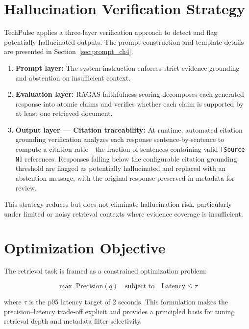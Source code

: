 \section{Hallucination Verification Strategy}
\label{sec:prompt}

TechPulse applies a three-layer verification approach to detect and flag potentially hallucinated outputs. The prompt construction and template details are presented in Section~\ref{sec:prompt_ch4}.

\begin{enumerate}[leftmargin=0.5in]
  \item \textbf{Prompt layer:} The system instruction enforces strict evidence grounding and abstention on insufficient context.

  \item \textbf{Evaluation layer:} RAGAS faithfulness scoring decomposes each generated response into atomic claims and verifies whether each claim is supported by at least one retrieved document.

  \item \textbf{Output layer --- Citation traceability:} At runtime, automated citation grounding verification analyzes each response sentence-by-sentence to compute a citation ratio---the fraction of sentences containing valid \texttt{[Source N]} references. Responses falling below the configurable citation grounding threshold are flagged as potentially hallucinated and replaced with an abstention message, with the original response preserved in metadata for review.
\end{enumerate}

\noindent This strategy reduces but does not eliminate hallucination risk, particularly under limited or noisy retrieval contexts where evidence coverage is insufficient.

\section{Optimization Objective}
\label{sec:optimization}

The retrieval task is framed as a constrained optimization problem:

\begin{equation}
  \max \; \text{Precision}(q) \quad \text{subject to} \quad \text{Latency} \leq \tau
  \label{eq:opt}
\end{equation}

where $\tau$ is the p95 latency target of 2 seconds. This formulation makes the precision--latency trade-off explicit and provides a principled basis for tuning retrieval depth and metadata filter selectivity.

